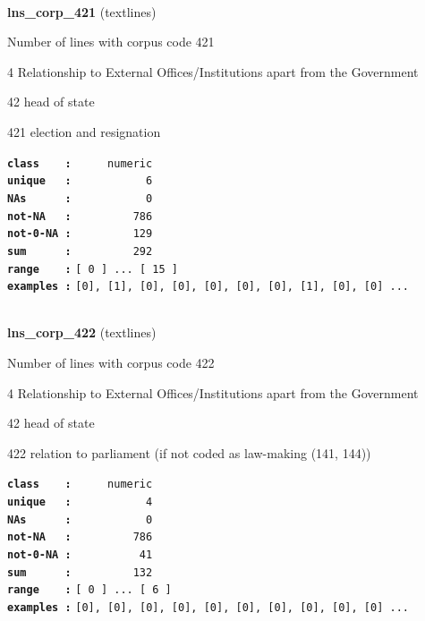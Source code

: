 \documentclass[]{article}
\begin{document}
~

\textbf{lns\_corp\_421} (textlines)

Number of lines with corpus code 421

4 Relationship to External Offices/Institutions apart from the
Government

42 head of state

421 election and resignation

\textbf{\texttt{class\ \ \ \ :}} \texttt{~~~~~numeric}\\
\textbf{\texttt{unique\ \ \ :}} \texttt{~~~~~~~~~~~6}\\
\textbf{\texttt{NAs\ \ \ \ \ \ :}} \texttt{~~~~~~~~~~~0}\\
\textbf{\texttt{not-NA\ \ \ :}} \texttt{~~~~~~~~~786}\\
\textbf{\texttt{not-0-NA\ :}} \texttt{~~~~~~~~~129}\\
\textbf{\texttt{sum\ \ \ \ \ \ :}} \texttt{~~~~~~~~~292}\\
\textbf{\texttt{range\ \ \ \ :}}
\texttt{{[}\ 0\ {]}\ ...\ {[}\ 15\ {]}}\\
\textbf{\texttt{examples\ :}}
\texttt{{[}0{]},\ {[}1{]},\ {[}0{]},\ {[}0{]},\ {[}0{]},\ {[}0{]},\ {[}0{]},\ {[}1{]},\ {[}0{]},\ {[}0{]}\ ...}\\

~

\textbf{lns\_corp\_422} (textlines)

Number of lines with corpus code 422

4 Relationship to External Offices/Institutions apart from the
Government

42 head of state

422 relation to parliament (if not coded as law-making (141, 144))

\textbf{\texttt{class\ \ \ \ :}} \texttt{~~~~~numeric}\\
\textbf{\texttt{unique\ \ \ :}} \texttt{~~~~~~~~~~~4}\\
\textbf{\texttt{NAs\ \ \ \ \ \ :}} \texttt{~~~~~~~~~~~0}\\
\textbf{\texttt{not-NA\ \ \ :}} \texttt{~~~~~~~~~786}\\
\textbf{\texttt{not-0-NA\ :}} \texttt{~~~~~~~~~~41}\\
\textbf{\texttt{sum\ \ \ \ \ \ :}} \texttt{~~~~~~~~~132}\\
\textbf{\texttt{range\ \ \ \ :}}
\texttt{{[}\ 0\ {]}\ ...\ {[}\ 6\ {]}}\\
\textbf{\texttt{examples\ :}}
\texttt{{[}0{]},\ {[}0{]},\ {[}0{]},\ {[}0{]},\ {[}0{]},\ {[}0{]},\ {[}0{]},\ {[}0{]},\ {[}0{]},\ {[}0{]}\ ...}\\
\end{document}
